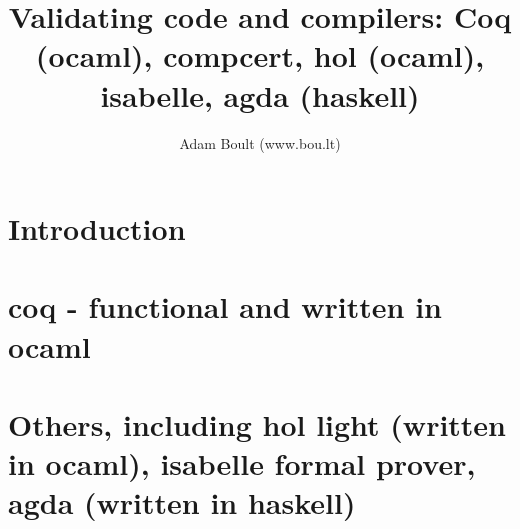 \documentclass[oneside]{book}
\begin{document}
\author{Adam Boult (www.bou.lt)}
\title{Validating code and compilers: Coq (ocaml), compcert, hol (ocaml), isabelle, agda (haskell)}
\maketitle

\setcounter{tocdepth}{0}
\tableofcontents



\part{Introduction}

\part{coq - functional and written in ocaml}


\part{Others, including hol light (written in ocaml), isabelle formal prover, agda (written in haskell)}
\end{document}
